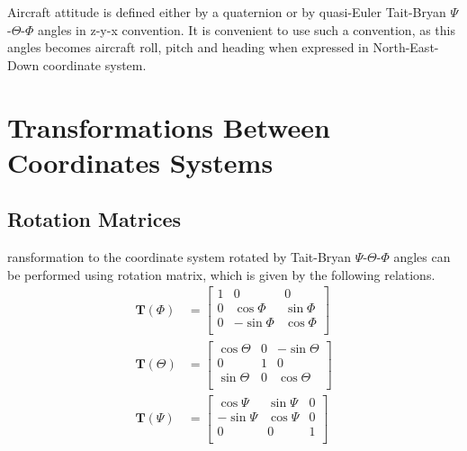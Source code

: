 Aircraft attitude is defined either by a quaternion or by quasi-Euler Tait-Bryan $\Psi$\nobreakdash-$\Theta$\nobreakdash-$\Phi$ angles in z\nobreakdash-y\nobreakdash-x convention. It is convenient to use such a convention, as this angles becomes aircraft roll, pitch and heading when expressed in North\nobreakdash-East\nobreakdash-Down coordinate system.

\section{Transformations Between Coordinates Systems}

\subsection{Rotation Matrices}

ransformation to the coordinate system rotated by Tait-Bryan $\Psi$\nobreakdash-$\Theta$\nobreakdash-$\Phi$ angles can be performed using rotation matrix, which is given by the following relations. \cite{Padfield2007, Sibilski2004}
\begin{align}
  \boldsymbol T \left( \Phi \right) &=
  \left[
    \begin{matrix}
      1 &          0 &         0 \\
      0 &  \cos \Phi & \sin \Phi \\
      0 & -\sin \Phi & \cos \Phi \\
    \end{matrix}
  \right]
  \\
  \boldsymbol T \left( \Theta \right) &=
  \left[
    \begin{matrix}
      \cos \Theta & 0 & -\sin \Theta \\
                0 & 1 &            0 \\
      \sin \Theta & 0 &  \cos \Theta \\
    \end{matrix}
  \right]
  \\
  \boldsymbol T \left( \Psi \right) &=
  \left[
    \begin{matrix}
       \cos\Psi & \sin\Psi & 0 \\
      -\sin\Psi & \cos\Psi & 0 \\
              0 &        0 & 1 \\
    \end{matrix}
  \right]
\end{align}

